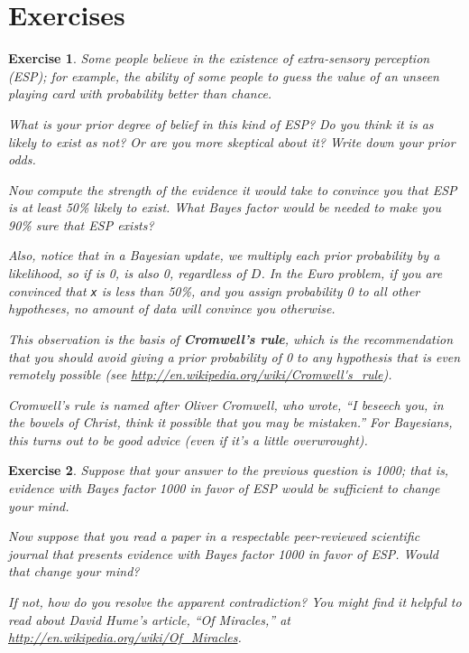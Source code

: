 \documentclass[12pt]{book}
\theoremstyle{exercise}
\newtheorem{exercise}{Exercise}[chapter]
\newcommand{\py}[1]{{\tt #1}}%
\begin{document}
\section{Exercises}


\begin{exercise}
Some people believe in the existence of extra-sensory
perception (ESP); for example, the ability of some people to guess
the value of an unseen playing card with probability better
than chance.

What is your prior degree of belief in this kind of ESP?
Do you think it is as likely to exist as not?  Or are you
more skeptical about it?  Write down your prior odds.

Now compute the strength of the evidence it would take to
convince you that ESP is at least 50\% likely to exist.
What Bayes factor would be needed to make you 90\% sure
that ESP exists?

Also, notice that in a Bayesian update, we multiply
each prior probability by a likelihood, so if  is 0,
 is also 0, regardless of $D$.  In the Euro problem,
if you are convinced that \py{x} is less than 50\%, and you assign
probability 0 to all other hypotheses, no amount of data will
convince you otherwise.

This observation is the basis of {\bf Cromwell's rule}, which is the
recommendation that you should avoid giving a prior probability of
0 to any hypothesis that is even remotely possible
(see \url{http://en.wikipedia.org/wiki/Cromwell's_rule}).

Cromwell's rule is named after Oliver Cromwell, who wrote, ``I beseech
you, in the bowels of Christ, think it possible that you may be
mistaken.''  For Bayesians, this turns out to be good advice (even if
it's a little overwrought).
\end{exercise}


\begin{exercise}
Suppose that your answer to the previous question is 1000;
that is, evidence with Bayes factor 1000 in favor of ESP would
be sufficient to change your mind.

Now suppose that you read a paper in a respectable peer-reviewed
scientific journal that presents evidence with Bayes factor 1000 in
favor of ESP.  Would that change your mind?

If not, how do you resolve the apparent contradiction?
You might find it helpful to read about David Hume's article, ``Of
Miracles,'' at \url{http://en.wikipedia.org/wiki/Of_Miracles}.

\end{exercise}
\end{document}

